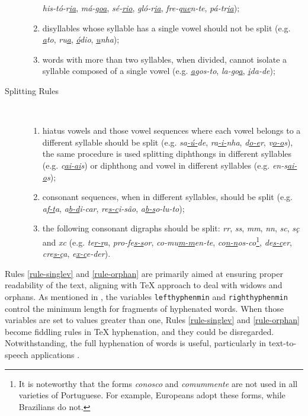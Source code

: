 \begin{description}
\begin{enumerate}
  \emph{his-tó-r\underline{ia}}, \emph{má-g\underline{oa}}, 
  \emph{sé-\underline{rio}}, \emph{gló-r\underline{ia}}, \emph{fre-q\underline{ue}n-te},
  \emph{pá-tr\underline{ia}});
    \item\label{rule-singlev} disyllables whose syllable has a single vowel should 
	not be split (e.g. \emph{\underline{a}to}, \emph{ru\underline{a}}, 
	\emph{\underline{ó}dio}, \emph{\underline{u}nha});
    \item\label{rule-orphan} words with more than two syllables, when divided, cannot 
	isolate a syllable composed of a single vowel (e.g. \emph{\underline{a}gos-to}, 
	\emph{la-go\underline{a}}, \emph{\underline{i}da-de});
\end{enumerate}

\item[Splitting Rules]\ 

\begin{enumerate}[resume]
    \item\label{rule-hiatus} hiatus vowels and those vowel sequences where each vowel
	belongs to a different syllable should be split (e.g.
	\emph{sa\underline{-ú-}de}, \emph{ra\underline{-i-}nha}, \emph{d\underline{o-e}r},
	\emph{v\underline{o-o}s}), the same procedure is used splitting diphthongs
	in different syllables (e.g. \emph{c\underline{ai-ai}s}) or diphthong and
	vowel in different syllables (e.g. \emph{en-s\underline{ai-o}s});
    \item\label{rule-consonants} consonant sequences, when in different syllables, should
	be split (e.g. \emph{a\underline{f-t}a}, \emph{a\underline{b-d}i-car},
	\emph{re\underline{s-c}i-são}, \emph{a\underline{b-s}o-lu-to});
    \item\label{rule-digraphs} the following consonant digraphs should be split:
	\emph{rr}, \emph{ss}, \emph{mm}, \emph{nn}, \emph{sc}, \emph{sç} and
	\emph{xc} (e.g. \emph{te\underline{r-r}a}, \emph{pro-fe\underline{s-s}or},
  \emph{co-mu\underline{\emph{m-m}}en-te}, \emph{co\underline{n-n}os-co}\footnote{It is noteworthy that the forms \emph{conosco} and \emph{comummente} are not used in all varieties of Portuguese. For example, Europeans adopt these forms, while Brazilians do not.},
	\emph{de\underline{s-c}er}, \emph{cre\underline{s-ç}a}, \emph{e\underline{x-c}e-der}).
\end{enumerate}
\end{description}

Rules \ref{rule-singlev} and \ref{rule-orphan} are primarily aimed at ensuring
proper readability of the text, aligning with \TeX{} approach to deal with
widows and orphans. As mentioned in , the variables
\verb|lefthyphenmin| and \verb|righthyphenmin| control the minimum length for
fragments of hyphenated words.  When those variables are set to values greater
than one, Rules \ref{rule-singlev} and \ref{rule-orphan} become fiddling rules
in \TeX{} hyphenation, and they could be disregarded. Notwithstanding, the full
hyphenation of words is useful, particularly in text-to-speech applications
\parencite{libossek2000,trogkanis2010}.

